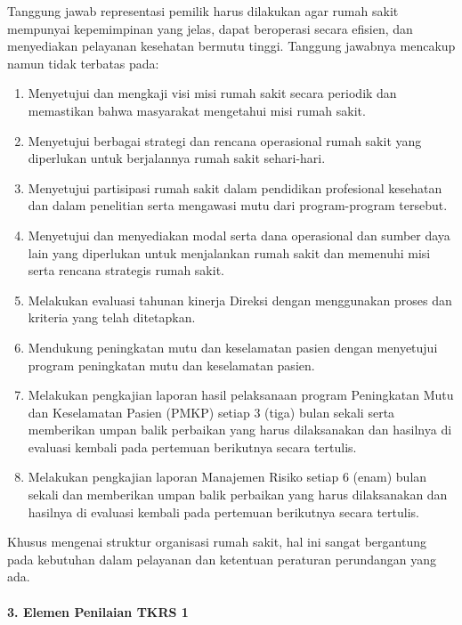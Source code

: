 \documentclass[
]{book}
\providecommand{\tightlist}{%
  \setlength{\itemsep}{0pt}\setlength{\parskip}{0pt}}
\begin{document}
Tanggung jawab representasi pemilik harus dilakukan agar rumah sakit mempunyai kepemimpinan yang jelas, dapat beroperasi secara efisien, dan menyediakan pelayanan kesehatan bermutu tinggi. Tanggung jawabnya mencakup namun tidak terbatas pada:

\begin{enumerate}
\def\labelenumi{\alph{enumi}.}
\tightlist
\item
  Menyetujui dan mengkaji visi misi rumah sakit secara periodik dan memastikan bahwa masyarakat mengetahui misi rumah sakit.
\item
  Menyetujui berbagai strategi dan rencana operasional rumah sakit yang diperlukan untuk berjalannya rumah sakit sehari-hari.
\item
  Menyetujui partisipasi rumah sakit dalam pendidikan profesional kesehatan dan dalam penelitian serta mengawasi mutu dari program-program tersebut.
\item
  Menyetujui dan menyediakan modal serta dana operasional dan sumber daya lain yang diperlukan untuk menjalankan rumah sakit dan memenuhi misi serta rencana strategis rumah sakit.
\item
  Melakukan evaluasi tahunan kinerja Direksi dengan menggunakan proses dan kriteria yang telah ditetapkan.
\item
  Mendukung peningkatan mutu dan keselamatan pasien dengan menyetujui program peningkatan mutu dan keselamatan pasien.
\item
  Melakukan pengkajian laporan hasil pelaksanaan program Peningkatan Mutu dan Keselamatan Pasien (PMKP) setiap 3 (tiga) bulan sekali serta memberikan umpan balik perbaikan yang harus dilaksanakan dan hasilnya di evaluasi kembali pada pertemuan berikutnya secara tertulis.
\item
  Melakukan pengkajian laporan Manajemen Risiko setiap 6 (enam) bulan sekali dan memberikan umpan balik perbaikan yang harus dilaksanakan dan hasilnya di evaluasi kembali pada pertemuan berikutnya secara tertulis.
\end{enumerate}

Khusus mengenai struktur organisasi rumah sakit, hal ini sangat bergantung pada kebutuhan dalam pelayanan dan ketentuan peraturan perundangan yang ada.

\hypertarget{elemen-penilaian-tkrs-1}{%
\paragraph*{3. Elemen Penilaian TKRS 1}\label{elemen-penilaian-tkrs-1}}
\end{document}
